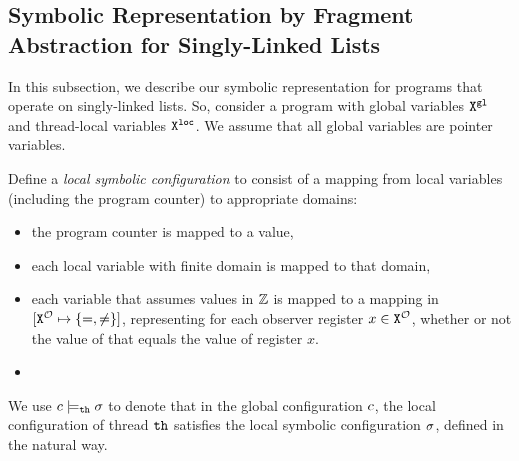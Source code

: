 

\subsection{Symbolic Representation by Fragment Abstraction for Singly-Linked Lists}
In this subsection, we describe our symbolic representation for programs that
operate on singly-linked lists.
So, consider a program with global variables ${\tt X}^{\tt gl}$ and thread-local variables ${\tt X}^{\tt loc}$. We assume that all global variables are pointer variables.

Define a {\em local symbolic configuration} to consist of a mapping from local
variables (including the program counter) to appropriate domains:
\begin{itemize}
\item the program counter is mapped to a value,
\item each local variable with finite domain is mapped to that domain,
\item each variable that assumes values in ${\mathbb Z}$ is mapped to
  a mapping in  $[{\tt X}^{{\mathcal O}} \mapsto{\left\{=,\neq\right\}}]$, representing for
  each observer register $x  \in {\tt X}^{{\mathcal O}}$, whether or not the value
  of that equals the value of register $x$.
\item {}
\end{itemize}
We use $c \models_{{\tt th}} \sigma$ to denote that in the
global configuration $c$, the
local configuration of thread ${\tt th}$ satisfies the local symbolic
configuration $\sigma$, defined in the natural way.


